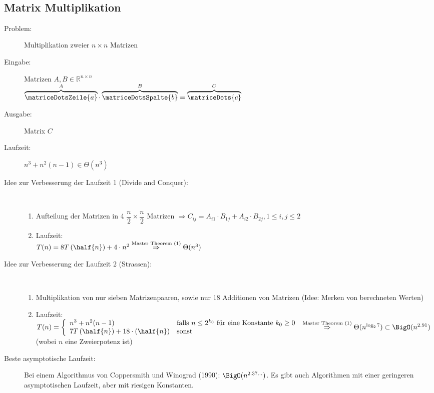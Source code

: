 \\\vspace*{-1.5\baselineskip}
\subsection{Matrix Multiplikation}
\begin{description}
	\item[Problem:] Multiplikation zweier $n\times n $ Matrizen
	\item[Eingabe:] Matrizen $A,B \in \mathbb{R}^{n\times n}$\\
		$\overbrace{\matriceDotsZeile{a}}^{A} \cdot \overbrace{\matriceDotsSpalte{b}}^{B} = \overbrace{\matriceDots{c}}^{C}$
	\item[Ausgabe:] Matrix $C$
	\item[Laufzeit:] $n^3+n^2(n-1) \in \Theta(n^3)$
	\item[Idee zur Verbesserung der Laufzeit 1 (Divide and Conquer):]\ \\\vspace*{-\baselineskip}
		\begin{enumerate}
			\item Aufteilung der Matrizen in 4 $\dfrac{n}{2}\times \dfrac{n}{2}$ Matrizen $\Rightarrow C_{ij} = A_{i1} \cdot B_{1j} + A_{i2} \cdot B_{2j}, 1\leq i,j\leq 2$
			\item Laufzeit:\\
			$T(n)= 8T\left(\half{n}\right)+4\cdot n^2\\
			\overset{\text{Master Theorem (1)}}{\Rightarrow} \Theta(n^3)$
		\end{enumerate}
\end{description}
\topbreak
\vspace*{-1\baselineskip}
\begin{description}
	\item[Idee zur Verbesserung der Laufzeit 2 (Strassen):]\ \\\vspace*{-\baselineskip}
		\begin{enumerate}
			\item Multiplikation von nur sieben Matrizenpaaren, sowie nur 18 Additionen von Matrizen (Idee: Merken von berechneten Werten)
			\item Laufzeit:\\$T(n)=
				\left\lbrace
					\begin{array}{ll}
						n^3 + n^2(n-1) & \text{falls } n\leq 2^{k_0} \text{ für eine Konstante } k_0 \geq 0\\
						7T\left(\half{n}\right)+18\cdot \left(\half{n}\right) & \text{sonst}
					\end{array}
				\right.
				\\
				\overset{\text{Master Theorem (1)}}{\Rightarrow} \Theta(n^{\log_2 7})\subset\BigO(n^{2.91})$ (wobei $n$ eine Zweierpotenz ist)
		\end{enumerate}
	\item[Beste asymptotische Laufzeit:] Bei einem Algorithmus von Coppersmith und Winograd (1990): $\BigO(n^{2.37\dots})$. Es gibt auch Algorithmen mit einer geringeren asymptotischen Laufzeit, aber mit riesigen Konstanten.
\end{description}

